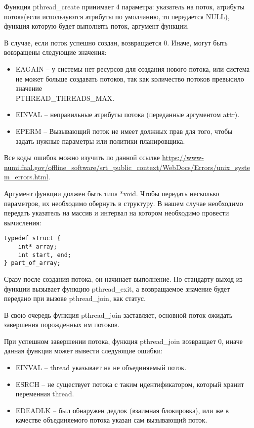 Функция pthread\_create принимает 4 параметра: указатель на поток, атрибуты потока(если используются атрибуты по умолчанию, то передается NULL), функция которую будет выполнять поток, аргумент функции.

В случае, если поток успешно создан, возвращается 0. Иначе, могут быть вовзращены следующие значения:

\begin{itemize}
    \item EAGAIN – у системы нет ресурсов для создания нового потока, или система не может больше создавать потоков, так как количество потоков превысило значение \\ PTHREAD\_THREADS\_MAX\@.
    \item EINVAL – неправильные атрибуты потока (переданные аргументом attr).
    \item EPERM – Вызывающий поток не имеет должных прав для того, чтобы задать нужные параметры или политики планировщика.
\end{itemize}

Все коды ошибок можно изучить по данной ссылке \url{https://www-numi.fnal.gov/offline_software/srt_public_context/WebDocs/Errors/unix_system_errors.html}.

Аргумент функции должен быть типа *void. Чтобы передать несколько параметров, их необходимо обернуть в структуру. В нашем случае необходимо передать указатель на массив и интервал на котором необходимо провести вычисления:

\begin{verbatim}
typedef struct {
    int* array;
    int start, end;
} part_of_array;
\end{verbatim}

Сразу после создания потока, он начинает выполнение. По стандарту выход из функции вызывает функцию pthread\_exit, а возвращаемое значение будет передано при вызове pthread\_join, как статус.

В свою очередь функция pthread\_join заставляет, основной поток ожидать завершения порожденных им потоков.

При успешном завершении потока, функция pthread\_join возвращает 0, иначе данная функция может вывести следующие ошибки:

\begin{itemize}
    \item EINVAL – thread указывает на не объединяемый поток.
    \item ESRCH – не существует потока с таким идентификатором, который хранит переменная thread.
    \item EDEADLK – был обнаружен дедлок (взаимная блокировка), или же в качестве объединяемого потока указан сам вызывающий поток.
\end{itemize}

